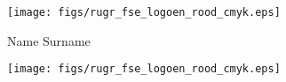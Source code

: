 
\thispagestyle{empty}

\noindent
\texttt{[image: figs/rugr\_fse\_logoen\_rood\_cmyk.eps]}

\begin{center}

\vspace{6cm}%

{\fontsize{29pt}{34.8pt}\selectfont \textbf{\theprojecttitle}\par} %


\vspace{9cm}%

{\Large Name Surname}

\end{center}

\clearpage


\thispagestyle{empty}

\noindent
\texttt{[image: figs/rugr\_fse\_logoen\_rood\_cmyk.eps]}

